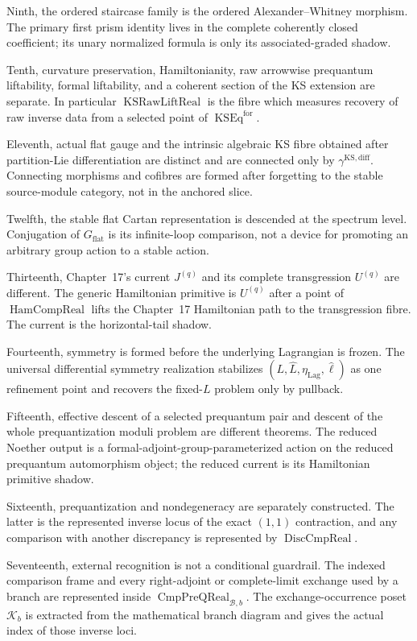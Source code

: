 Ninth, the ordered staircase family is the ordered Alexander--Whitney morphism.
The primary first prism identity lives in the complete coherently closed
coefficient; its unary normalized formula is only its associated-graded shadow.

Tenth, curvature preservation, Hamiltonianity, raw arrowwise prequantum
liftability, formal liftability, and a coherent section of the KS extension are
separate.  In particular
$\operatorname{KSRawLiftReal}$ is the fibre which measures recovery of raw
inverse data from a selected point of $\operatorname{KSEq}^{\mathrm{for}}$.

Eleventh, actual flat gauge and the intrinsic algebraic KS fibre obtained after
partition-Lie differentiation are distinct and are connected only by
$\gamma^{\mathrm{KS,diff}}$.  Connecting morphisms and cofibres are formed after
forgetting to the stable source-module category, not in the anchored slice.

Twelfth, the stable flat Cartan representation is descended at the spectrum level.
Conjugation of $G_{\mathrm{flat}}$ is its infinite-loop comparison, not a device
for promoting an arbitrary group action to a stable action.

Thirteenth, Chapter~17's current $J^{(q)}$ and its complete transgression
$U^{(q)}$ are different.  The generic Hamiltonian primitive is $U^{(q)}$ after a
point of $\operatorname{HamCompReal}$ lifts the Chapter~17 Hamiltonian path to the
transgression fibre.  The current is the horizontal-tail shadow.

Fourteenth, symmetry is formed before the underlying Lagrangian is frozen.  The
universal differential symmetry realization stabilizes
$(L,\widehat L,\eta_{\mathrm{Lag}},\widehat\ell)$ as one refinement point and
recovers the fixed-$L$ problem only by pullback.

Fifteenth, effective descent of a selected prequantum pair and descent of the
whole prequantization moduli problem are different theorems.  The reduced Noether
output is a formal-adjoint-group-parameterized action on the reduced prequantum
automorphism object; the reduced current is its Hamiltonian primitive shadow.

Sixteenth, prequantization and nondegeneracy are separately constructed.  The
latter is the represented inverse locus of the exact $(1,1)$ contraction, and
any comparison with another discrepancy is represented by
$\operatorname{DiscCmpReal}$.

Seventeenth, external recognition is not a conditional guardrail.  The indexed
comparison frame and every right-adjoint or complete-limit exchange used by a
branch are represented inside $\operatorname{CmpPreQReal}_{\mathcal B,b}$.
The exchange-occurrence poset $\mathcal K_b$ is extracted from the mathematical branch
diagram and gives the actual index of those inverse loci.

